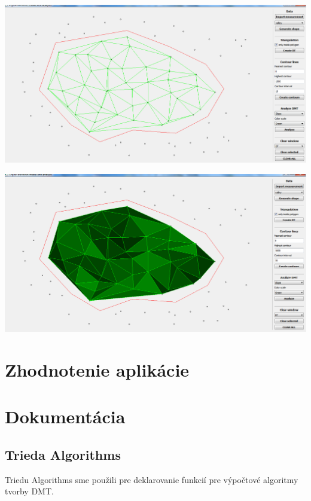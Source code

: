 \documentclass[12pt]{article}
\begin{document}
\begin{center}
   \includegraphics[width=14cm]{./img/select_polygon_to_DT.png}
\end{center}

\begin{center}
   \includegraphics[width=14cm]{./img/select_polygon_to_DT_slope.png}
\end{center}

\clearpage 
\section{Zhodnotenie aplikácie}



\section{Dokumentácia}
\subsection{Trieda Algorithms}
Triedu Algorithms sme použili pre deklarovanie funkcií pre výpočtové algoritmy tvorby DMT.
\end{document}
